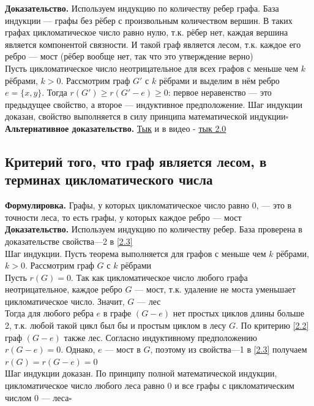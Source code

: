 \documentclass[a4paper]{article}
\begin{document}
\indent\textbf{Доказательство.} Используем индукцию по количеству ребер графа. База индукции — графы без рёбер с произвольным количеством вершин. В таких графах цикломатическое число равно нулю, т.к. рёбер нет, каждая вершина является компонентой связности. И такой граф является лесом, т.к. каждое его ребро — мост (рёбер вообще нет, так что это утверждение верно)\\[2mm]
\indent Пусть цикломатическое число неотрицательное для всех графов с меньше чем $k$ рёбрами, $k > 0$. Рассмотрим граф $G'$ с $k$ рёбрами и выделим в нём ребро $e = \{x, y\}$.
Тогда $r(G') \geqslant r(G'-e) \geqslant 0$: первое неравенство — это предыдущее свойство, а второе — индуктивное предположение. Шаг индукции доказан, свойство выполняется в силу принципа математической индукции\hfill$\square$\\[2mm]
\indent \textbf{Альтернативное доказательство.} \href{https://studfile.net/preview/300139/page:2/}{Тык} и в видео - \href{https://youtu.be/1k7wX_YhigE?si=0m5CQdBiml5Wa97j&t=3465}{тык 2.0}
\label{2.3}

\subsection{Критерий того, что граф является лесом, в терминах цикломатического числа}\label{2.4}
\textbf{Формулировка.} Графы, у которых цикломатическое число равно 0, — это в точности леса, то есть графы, у которых каждое ребро — мост\\[2mm]
\indent\textbf{Доказательство.} Используем индукцию по количеству ребер. База проверена в доказательстве свойства—2 в \ref{2.3}\\[2mm]
\indent Шаг индукции. Пусть теорема выполняется для графов с меньше чем $k$ рёбрами,
$k > 0$. Рассмотрим граф $G$ с $k$ рёбрами\\[2mm]
\indent Пусть $r(G)=0$. Так как цикломатическое число любого графа неотрицательное, каждое ребро $G$ — мост, т.к. удаление не моста уменьшает цикломатическое число. Значит, $G$ — лес\\[2mm]
\indent Тогда для любого ребра $e$ в графе $(G-e)$ нет простых циклов длины больше 2, т.к. любой такой цикл был бы и простым циклом в лесу $G$. По критерию \ref{2.2} граф $(G-e)$ также лес. Согласно индуктивному предположению $r(G-e)=0$. Однако, $e$ — мост в $G$, поэтому из свойства—1 в \ref{2.3} получаем $r(G)=r(G-e)=0$\\[2mm]
\indent Шаг индукции доказан. По принципу полной математической индукции, цикломатическое число любого леса равно 0 и все графы с цикломатическим числом 0 — леса\hfill$\square$
\end{document}
